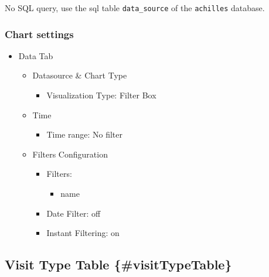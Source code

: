 \documentclass[
]{book}
\providecommand{\tightlist}{%
  \setlength{\itemsep}{0pt}\setlength{\parskip}{0pt}}
\begin{document}
No SQL query, use the sql table \texttt{data\_source} of the \texttt{achilles} database.

\hypertarget{chart-settings-25}{%
\subsubsection*{Chart settings}\label{chart-settings-25}}

\begin{itemize}
\tightlist
\item
  Data Tab

  \begin{itemize}
  \tightlist
  \item
    Datasource \& Chart Type

    \begin{itemize}
    \tightlist
    \item
      Visualization Type: Filter Box
    \end{itemize}
  \item
    Time

    \begin{itemize}
    \tightlist
    \item
      Time range: No filter
    \end{itemize}
  \item
    Filters Configuration

    \begin{itemize}
    \tightlist
    \item
      Filters:

      \begin{itemize}
      \tightlist
      \item
        name
      \end{itemize}
    \item
      Date Filter: off
    \item
      Instant Filtering: on
    \end{itemize}
  \end{itemize}
\end{itemize}

\hypertarget{visit-type-table-visittypetable}{%
\subsection*{Visit Type Table \{\#visitTypeTable\}}\label{visit-type-table-visittypetable}}
\end{document}
